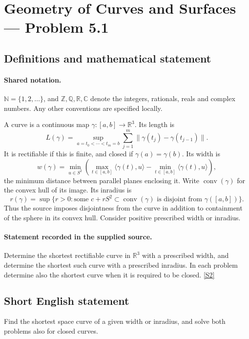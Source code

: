 \documentclass[11pt]{article}
\newcommand{\sref}[2]{\hyperlink{source:#1:#2}{[S#2]}}
\begin{document}
\section{Geometry of Curves and Surfaces — Problem 5.1}\label{statement}

\subsection{Definitions and mathematical statement}

\paragraph{Shared notation.}$\mathbb N=\{1,2,\ldots\}$, and $\mathbb Z,\mathbb Q,\mathbb R,\mathbb C$ denote the integers, rationals, reals and complex numbers. Any other conventions are specified locally.


A curve is a continuous map $\gamma:[a,b]\to\mathbb R^3$. Its length is
\[L(\gamma)=\sup_{a=t_0<\cdots<t_m=b}\sum_{j=1}^m\lVert\gamma(t_j)-\gamma(t_{j-1})\rVert.\]
It is rectifiable if this is finite, and closed if $\gamma(a)=\gamma(b)$. Its width is
\[w(\gamma)=\min_{u\in S^2}\left(\max_{t\in[a,b]}\langle\gamma(t),u\rangle-\min_{t\in[a,b]}\langle\gamma(t),u\rangle\right),\]
the minimum distance between parallel planes enclosing it. Write $\operatorname{conv}(\gamma)$ for the convex hull of its image. Its inradius is
\[r(\gamma)=\sup\{r>0:\text{some }c+rS^2\subset\operatorname{conv}(\gamma)\text{ is disjoint from }\gamma([a,b])\}.\]
Thus the source imposes disjointness from the curve in addition to containment of the sphere in its convex hull. Consider positive prescribed width or inradius.
\paragraph{Statement recorded in the supplied source.}
Determine the shortest rectifiable curve in $\mathbb R^3$ with a prescribed width, and determine the shortest such curve with a prescribed inradius. In each problem determine also the shortest curve when it is required to be closed. \sref{statement}{2}
\subsection{Short English statement}
Find the shortest space curve of a given width or inradius, and solve both problems also for closed curves.
\end{document}
